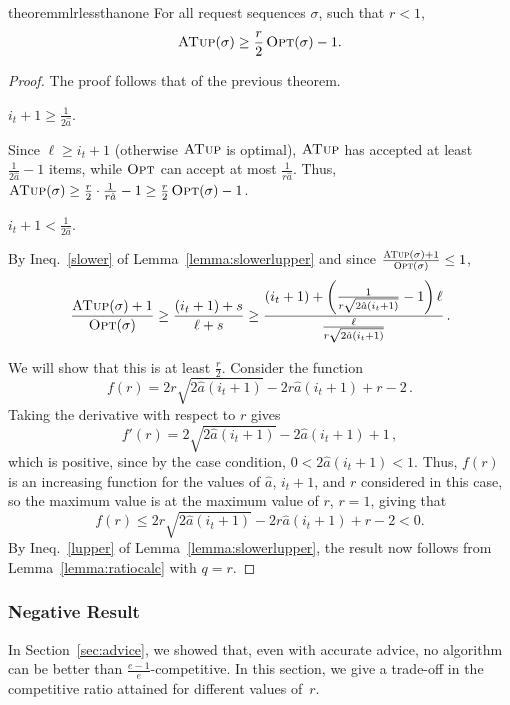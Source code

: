 \documentclass[a4paper,UKenglish,cleveref, autoref, thm-restate]{lipics-v2021}
\newcommand{\OPT}{\ensuremath{\operatorname{\textsc{Opt}}}\xspace}
\newcommand{\MLB}{\ensuremath{\operatorname{\textsc{ATup}}}\xspace}
\newcommand{\guess}{\ensuremath{\hat{a}}\xspace}
\begin{document}
\begin{restatable}{theorem}{mlrlessthanone}
    \label{thm:mlrlessthan1}
  For all request sequences $\sigma$, such that $r< 1$,
  $$\MLB(\sigma) \geq \frac{r}{2}\OPT(\sigma)-1.$$
\end{restatable}
\begin{proof}
  The proof follows that of the previous theorem.

 $i_t+1 \geq \frac{1}{2\guess}$.
  
  Since $\ell\geq i_t+1$ (otherwise \MLB is optimal), \MLB has
  accepted at least $\frac{1}{2\guess}-1$ items, while \OPT can accept at
  most $\frac{1}{r\guess}$. Thus,
  $\MLB(\sigma)\geq \frac{r}{2}\cdot\frac{1}{r\guess}-1\geq
  \frac{r}{2}\OPT(\sigma)-1$.

 $i_t+1<\frac{1}{2\guess}$.

By Ineq.~\ref{slower} of Lemma~\ref{lemma:slowerlupper} and since
$\frac{\MLB(\sigma)+1}{\OPT(\sigma)}\leq 1$,
\[
     \frac{\MLB(\sigma)+1}{\OPT(\sigma)}
  \geq
  \frac{(i_t+1)+s}{\ell+s}
  \geq
  \frac{(i_t+1)+\left(
    \frac{1}{r\sqrt{2\guess(i_t+1)}} -1\right)\ell}{\frac{\ell}{r\sqrt{2\guess(i_t+1)}}}\,.
\]

We will show that this is at least $\frac{r}{2}$.  Consider the
function $$f(r)=2r\sqrt{2\guess(i_t+1)}-2r\guess(i_t+1)+r-2\,.$$ Taking the
derivative with respect to $r$ gives
$$f'(r)=2\sqrt{2\guess(i_t+1)}-2\guess(i_t+1)+1\,,$$ which is positive, since by the case condition,
$0<2\guess(i_t+1)<1$. Thus, $f(r)$ is an increasing function for the values
of $\guess$, $i_t+1$, and $r$ considered in this case, so the maximum value
is at the maximum value of $r$, $r=1$, giving that
\[
  f(r) \leq 2r\sqrt{2\guess(i_t+1)}-2r\guess(i_t+1)+r-2<0.
\]
By Ineq.~\ref{lupper} of Lemma~\ref{lemma:slowerlupper}, the result now
follows from Lemma~\ref{lemma:ratiocalc} with $q=r$.
\end{proof}


\subsubsection{Negative Result}

In Section~\ref{sec:advice}, we showed that, even with accurate
advice, no algorithm can be better than $\frac{e-1}{e}$-competitive.
In this section, we give a trade-off in the competitive ratio attained
for different values of~$r$.
\end{document}
